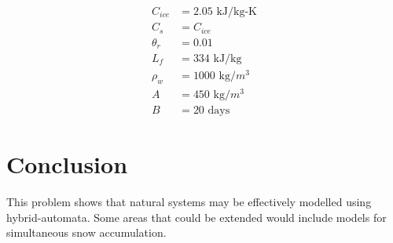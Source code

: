 \documentclass{article}
\begin{document}
\begin{align}
 C_{ice} &= 2.05 \text{ kJ/kg-K} \\
 C_s &= C_{ice} \\
\theta_r &= 0.01 \\
L_f &= 334 \text{ kJ/kg} \\
\rho_w &= 1000 \text{ kg/$m^3$} \\
A &= 450 \text{ kg/$m^3$} \\
B &= 20 \text{ days}
\end{align}

 \section{Conclusion}

 This problem shows that natural systems may be effectively
 modelled using hybrid-automata.
 Some areas that could be extended would include models
 for simultaneous snow accumulation.




\end{document}
